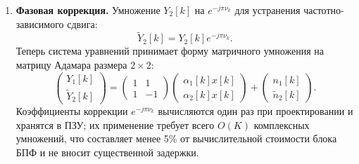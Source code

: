 \documentclass[a4paper,12pt]{article}
\numberwithin{equation}{section}
\begin{document}
\begin{enumerate}
    \item \textbf{Фазовая коррекция.} Умножение $Y_2[k]$ на $e^{-j \pi \nu_k}$ для устранения частотно-зависимого сдвига:
    \begin{equation}
    \tilde{Y}_2[k] = Y_2[k] e^{-j \pi \nu_k}.
    \end{equation}
    Теперь система уравнений принимает форму матричного умножения на матрицу Адамара размера $2\times2$:
    \begin{equation}
    \begin{pmatrix} Y_1[k] \\ \tilde{Y}_2[k] \end{pmatrix} = 
    \begin{pmatrix} 1 & 1 \\ 1 & -1 \end{pmatrix} 
    \begin{pmatrix} \alpha_1[k] x[k] \\ \alpha_2[k] x[k] \end{pmatrix} + 
    \begin{pmatrix} n_1[k] \\ \tilde{n}_2[k] \end{pmatrix}.
    \end{equation}
    Коэффициенты коррекции $e^{-j \pi \nu_k}$ вычисляются один раз при проектировании и хранятся в ПЗУ; их применение требует всего $O(K)$ комплексных умножений, что составляет менее 5\% от вычислительной стоимости блока БПФ и не вносит существенной задержки.
    

\end{enumerate}
\end{document}
